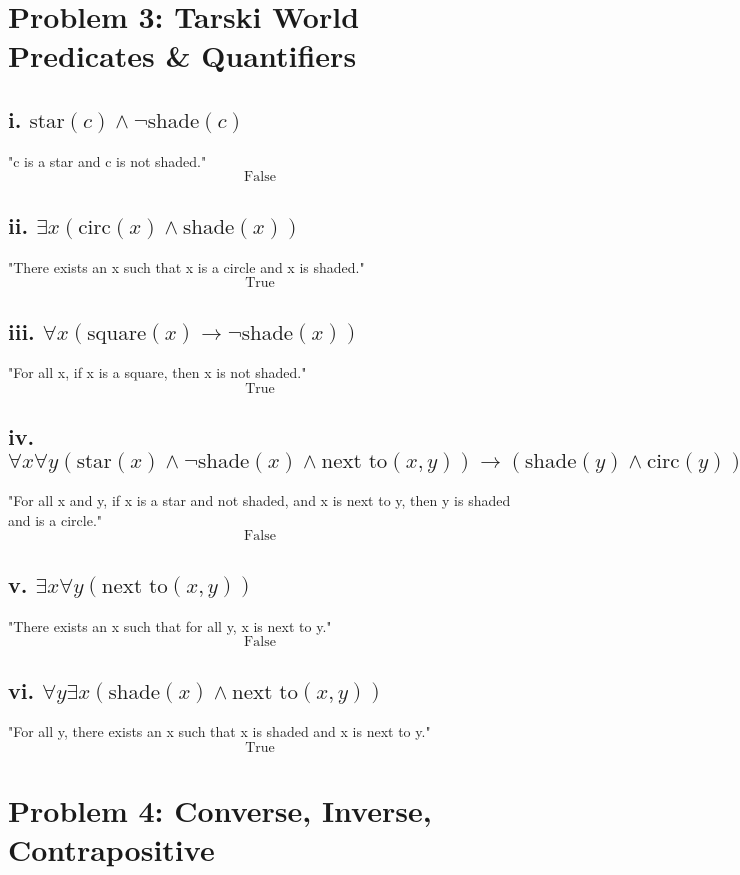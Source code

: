 \documentclass{article}
\begin{document}
\section*{Problem 3: Tarski World Predicates \& Quantifiers}

\subsection*{i. $\text{star}(c) \land \neg \text{shade}(c)$}
"c is a star and c is not shaded."
\[
\text{False}
\]

\subsection*{ii. $\exists x (\text{circ}(x) \land \text{shade}(x))$}
"There exists an x such that x is a circle and x is shaded."
\[
\text{True}
\]

\subsection*{iii. $\forall x (\text{square}(x) \rightarrow \neg \text{shade}(x))$}
"For all x, if x is a square, then x is not shaded."
\[
\text{True}
\]

\subsection*{iv. $\forall x \forall y (\text{star}(x) \land \neg \text{shade}(x) \land \text{next to}(x, y)) \rightarrow (\text{shade}(y) \land \text{circ}(y))$}
"For all x and y, if x is a star and not shaded, and x is next to y, then y is shaded and is a circle."
\[
\text{False}
\]

\subsection*{v. $\exists x \forall y (\text{next to}(x, y))$}
"There exists an x such that for all y, x is next to y."
\[
\text{False}
\]

\subsection*{vi. $\forall y \exists x (\text{shade}(x) \land \text{next to}(x, y))$}
"For all y, there exists an x such that x is shaded and x is next to y."
\[
\text{True}
\]
\newpage

\section*{Problem 4: Converse, Inverse, Contrapositive}
\end{document}
